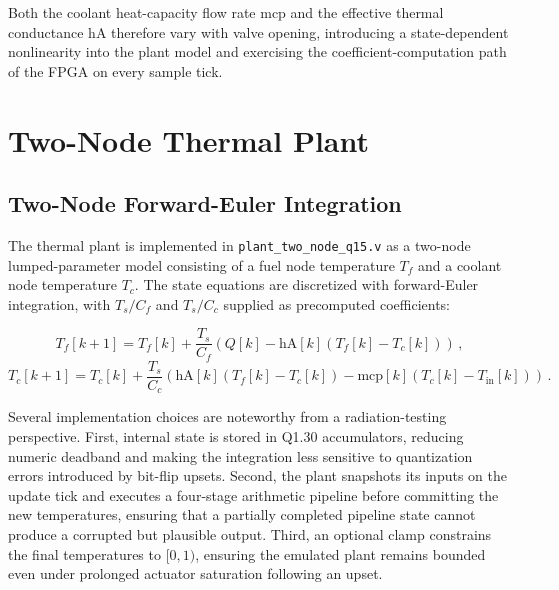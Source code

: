 Both the coolant heat-capacity flow rate $\mathrm{mcp}$ and the
effective thermal conductance $\mathrm{hA}$ therefore vary with valve
opening, introducing a state-dependent nonlinearity into the plant model
and exercising the coefficient-computation path of the FPGA on every
sample tick.

\section{Two-Node Thermal Plant}
\label{sec:bench_plant}

\subsection{Two-Node Forward-Euler Integration}
\label{ssec:bench_plant_euler}

The thermal plant is implemented in \texttt{plant\_two\_node\_q15.v} as
a two-node lumped-parameter model consisting of a fuel node temperature
$T_f$ and a coolant node temperature $T_c$.  The state equations are
discretized with forward-Euler integration, with $T_s/C_f$ and
$T_s/C_c$ supplied as precomputed coefficients:

\begin{equation}
  T_f[k+1] = T_f[k] + \frac{T_s}{C_f}\left(
    Q[k] - \mathrm{hA}[k]\left(T_f[k]-T_c[k]
\right)
\right) \, ,
  \label{eq:Tf}
\end{equation}
\begin{equation}
  T_c[k+1] = T_c[k] + \frac{T_s}{C_c}\left(
    \mathrm{hA}[k]\left(T_f[k]-T_c[k]
\right)
    - \mathrm{mcp}[k]\left(T_c[k]-T_{\mathrm{in}}[k]
\right)
\right) \, .
  \label{eq:Tc}
\end{equation}

Several implementation choices are noteworthy from a radiation-testing
perspective.  First, internal state is stored in Q1.30 accumulators,
reducing numeric deadband and making the integration less sensitive to
quantization errors introduced by bit-flip upsets.  Second, the plant
snapshots its inputs on the update tick and executes a four-stage
arithmetic pipeline before committing the new temperatures, ensuring
that a partially completed pipeline state cannot produce a corrupted but
plausible output.  Third, an optional clamp constrains the final
temperatures to $[0,1)$, ensuring the emulated plant remains bounded
even under prolonged actuator saturation following an upset.

